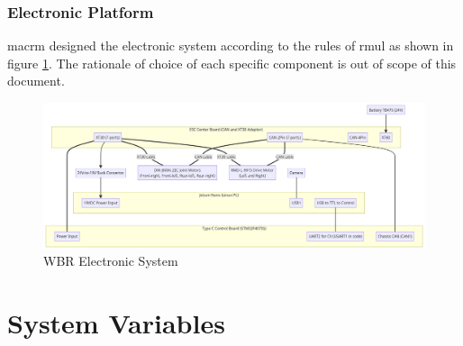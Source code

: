 \documentclass[12pt]{article}
\begin{document}
    \subsubsection{Electronic Platform}
    \acrshort{macrm} designed the electronic system according to the rules of \acrshort{rmul} as shown in figure \ref{fig:WBR Electronic System}. The rationale of choice of each specific component is out of scope of this document.
    \begin{figure}
        \centering
        \includegraphics[width=\textwidth,height=\textheight,keepaspectratio]{../Electronic System Diagram.png}
        \caption{WBR Electronic System}
        \label{fig:WBR Electronic System}
    \end{figure}

\section{System Variables} \label{sec:System Variables}    
\end{document}
